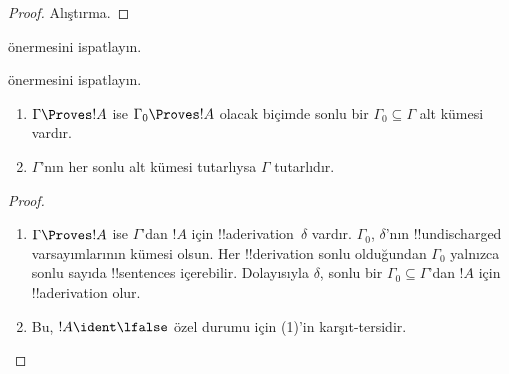 \begin{proof}
Alıştırma.
\end{proof}

\begin{prob}
 önermesini ispatlayın.
\end{prob}
\tagendprob

\begin{prob}
 önermesini ispatlayın.
\end{prob}
\tagendprob

\begin{prop}[Kompaktlık]
  \begin{enumerate}
  \item $\Gamma \Proves !A$ ise $\Gamma_0 \Proves !A$ olacak biçimde sonlu
    bir $\Gamma_0 \subseteq \Gamma$ alt kümesi vardır.
  \item $\Gamma$'nın her sonlu alt kümesi tutarlıysa $\Gamma$ tutarlıdır.
  \end{enumerate}
\end{prop}

\begin{proof}
  \begin{enumerate}
    \item $\Gamma \Proves !A$ ise $\Gamma$'dan $!A$ için
      !!a{derivation}~$\delta$ vardır. $\Gamma_0$, $\delta$'nın
      !!{undischarged} varsayımlarının kümesi olsun. Her !!{derivation} sonlu
      olduğundan $\Gamma_0$ yalnızca sonlu sayıda !!{sentence}s içerebilir.
      Dolayısıyla $\delta$, sonlu bir $\Gamma_0 \subseteq \Gamma$'dan
      $!A$ için !!a{derivation} olur.
    \item Bu, $!A \ident \lfalse$ özel durumu için (1)'in karşıt-tersidir.
  \end{enumerate}
\end{proof}

